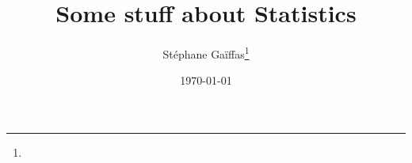 \documentclass[
	fontsize=11pt, %
	twoside=false, %
	numbers=noenddot, %
]{kaobook}
\begin{document}

\titlehead{Some stuff about statistics}
\subject{Lecture notes for the ENS course of Statistics}

\title[Some stuff about Statistics]{Some stuff about Statistics}

\author[St\'ephane Ga\"iffas"]{St\'ephane Ga\"iffas\thanks{}}

\date{\today}

\publishers{}


\frontmatter %





	
	
	
\end{document}
